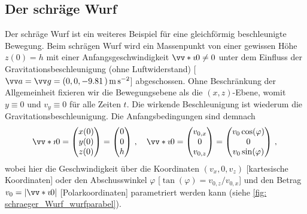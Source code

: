 \subsection{Der schräge Wurf}\label{subsec: schräge_wurf}
Der schräge Wurf ist ein weiteres Beispiel für eine gleichförmig beschleunigte Bewegung. Beim schrägen Wurf wird ein Massenpunkt von einer gewissen Höhe $z(0) = h$ mit einer Anfangsgeschwindigkeit $\ivecS{v}{0} \neq 0$ unter dem Einfluss der Gravitationsbeschleunigung (ohne Luftwiderstand) [$\ivec{a} = \ivec{g} = \inlrowThree{0}{0}{\qty{-9.81}}\,\si{\meter\per\second\squared}$] abgeschossen. Ohne Beschränkung der Allgemeinheit fixieren wir die Bewegungsebene als die $(x,z)$-Ebene, womit $y \equiv 0$ und $v_y \equiv 0$ für alle Zeiten $t$. Die wirkende Beschleunigung ist wiederum die Gravitationsbeschleunigung. Die Anfangsbedingungen sind demnach 
\begin{equation}\label{eq: anfangsbed_schräger_wurf}
    \ivecS{r}{0} = \icolThree{x(0)}{y(0)}{z(0)} = \icolThree{0}{0}{h} \mComma \quad \ivecS{v}{0} = \icolThree{v_{0,x}}{0}{v_{0,z}} = \icolThree{v_0 \cos(\varphi)}{0}{v_0 \sin(\varphi)} \mComma
\end{equation}
wobei hier die Geschwindigkeit über die Koordinaten $(v_x, 0, v_z)$ [kartesische Koordinaten] oder den Abschusswinkel $\varphi$ [$\tan(\varphi) = v_{0,z}/v_{0,x}$] und den Betrag $v_0 = |\ivecS{v}{0}|$ [Polarkoordinaten] parametriert werden kann (siehe \cref{fig: schraeger_Wurf_wurfparabel}).
